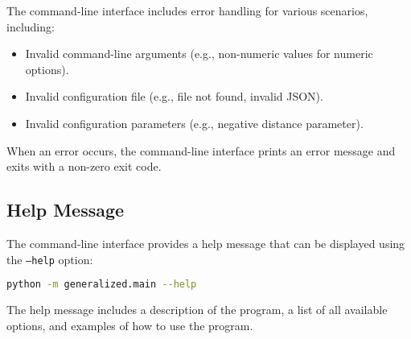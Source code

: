 The command-line interface includes error handling for various scenarios, including:

\begin{itemize}
    \item Invalid command-line arguments (e.g., non-numeric values for numeric options).
    \item Invalid configuration file (e.g., file not found, invalid JSON).
    \item Invalid configuration parameters (e.g., negative distance parameter).
\end{itemize}

When an error occurs, the command-line interface prints an error message and exits with a non-zero exit code.

\subsection{Help Message}

The command-line interface provides a help message that can be displayed using the \texttt{--help} option:

\begin{lstlisting}[language=bash]
python -m generalized.main --help
\end{lstlisting}

The help message includes a description of the program, a list of all available options, and examples of how to use the program.
